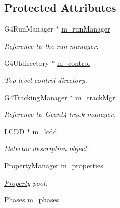 \subsection*{Protected Attributes}
\begin{DoxyCompactItemize}
\item 
G4\+Run\+Manager $\ast$ \hyperlink{class_d_d4hep_1_1_simulation_1_1_geant4_kernel_a3680634351832865b7df33095adf8ef7}{m\+\_\+run\+Manager}
\begin{DoxyCompactList}\small\item\em Reference to the run manager. \end{DoxyCompactList}\item 
G4\+U\+Idirectory $\ast$ \hyperlink{class_d_d4hep_1_1_simulation_1_1_geant4_kernel_a1b097ce042c194b7fc041c3457868c2c}{m\+\_\+control}
\begin{DoxyCompactList}\small\item\em Top level control directory. \end{DoxyCompactList}\item 
G4\+Tracking\+Manager $\ast$ \hyperlink{class_d_d4hep_1_1_simulation_1_1_geant4_kernel_a4bd577a1215149f49a745aa75b652565}{m\+\_\+track\+Mgr}
\begin{DoxyCompactList}\small\item\em Reference to Geant4 track manager. \end{DoxyCompactList}\item 
\hyperlink{class_d_d4hep_1_1_simulation_1_1_geant4_kernel_a190e652b62ebce3db3372c4265ffa5a3}{L\+C\+DD} $\ast$ \hyperlink{class_d_d4hep_1_1_simulation_1_1_geant4_kernel_a0181177a7c4b6862a83b3a34a64a3ce9}{m\+\_\+lcdd}
\begin{DoxyCompactList}\small\item\em Detector description object. \end{DoxyCompactList}\item 
\hyperlink{class_d_d4hep_1_1_property_manager}{Property\+Manager} \hyperlink{class_d_d4hep_1_1_simulation_1_1_geant4_kernel_ac69e53b910f7ce956e684c4e2ccedc9f}{m\+\_\+properties}
\begin{DoxyCompactList}\small\item\em \hyperlink{class_d_d4hep_1_1_property}{Property} pool. \end{DoxyCompactList}\item 
\hyperlink{class_d_d4hep_1_1_simulation_1_1_geant4_kernel_ae28985781d4226ece4c3fffe8827b400}{Phases} \hyperlink{class_d_d4hep_1_1_simulation_1_1_geant4_kernel_aa1357848649b7fccb42bbaa0c5f88f58}{m\+\_\+phases}

\end{DoxyCompactItemize}
